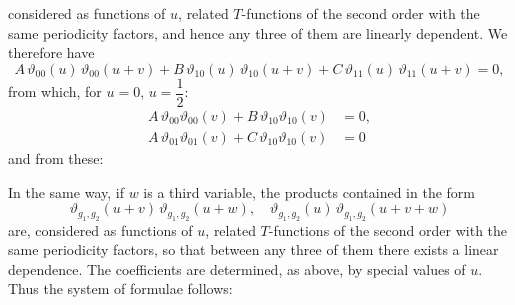 considered as functions of $u$, related $T$-functions of the second order with the same periodicity factors, and hence any three of them are linearly dependent. We therefore have
\[
A\,\vartheta_{00}(u)\,\vartheta_{00}(u+v) + B\,\vartheta_{10}(u)\,\vartheta_{10}(u+v) + C\,\vartheta_{11}(u)\,\vartheta_{11}(u+v) = 0,
\]
from which, for $u=0$, $u=\dfrac{1}{2}$:
\[
\begin{aligned}
A\,\vartheta_{00}\vartheta_{00}(v) + B\,\vartheta_{10}\vartheta_{10}(v) &= 0,\\
A\,\vartheta_{01}\vartheta_{01}(v) + C\,\vartheta_{10}\vartheta_{10}(v) &= 0
\end{aligned}
\]
and from these:


In the same way, if $w$ is a third variable, the products contained in the form
\[
\vartheta_{g_1,g_2}(u+v)\,\vartheta_{g_1,g_2}(u+w), \quad \vartheta_{g_1,g_2}(u)\,\vartheta_{g_1,g_2}(u+v+w)
\]
are, considered as functions of $u$, related $T$-functions of the second order with the same periodicity factors, so that between any three of them there exists a linear dependence. The coefficients are determined, as above, by special values of $u$. Thus the system of formulae follows:



